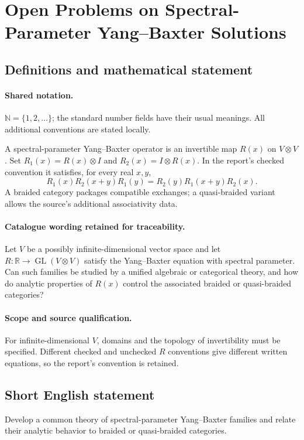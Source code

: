 \documentclass[11pt]{article}
\begin{document}
\section{Open Problems on Spectral-Parameter Yang–Baxter Solutions}\label{statement}

\subsection{Definitions and mathematical statement}

\paragraph{Shared notation.}$\mathbb N=\{1,2,\ldots\}$; the standard number fields have their usual meanings. All additional conventions are stated locally.


A spectral-parameter Yang--Baxter operator is an invertible map $R(x)$ on $V\otimes V$. Set $R_1(x)=R(x)\otimes I$ and $R_2(x)=I\otimes R(x)$. In the report's checked convention it satisfies, for every real $x,y$,
\[
R_1(x)R_2(x+y)R_1(y)=R_2(y)R_1(x+y)R_2(x).
\]
A braided category packages compatible exchanges; a quasi-braided variant allows the source's additional associativity data.

\paragraph{Catalogue wording retained for traceability.}
Let $V$ be a possibly infinite-dimensional vector space and let $R:\mathbb R\to\operatorname{GL}(V\otimes V)$ satisfy the Yang–Baxter equation with spectral parameter. Can such families be studied by a unified algebraic or categorical theory, and how do analytic properties of $R(x)$ control the associated braided or quasi-braided categories?

\paragraph{Scope and source qualification.}For infinite-dimensional $V$, domains and the topology of invertibility must be specified. Different checked and unchecked $R$ conventions give different written equations, so the report's convention is retained.
\subsection{Short English statement}
Develop a common theory of spectral-parameter Yang--Baxter families and relate their analytic behavior to braided or quasi-braided categories.
\end{document}
